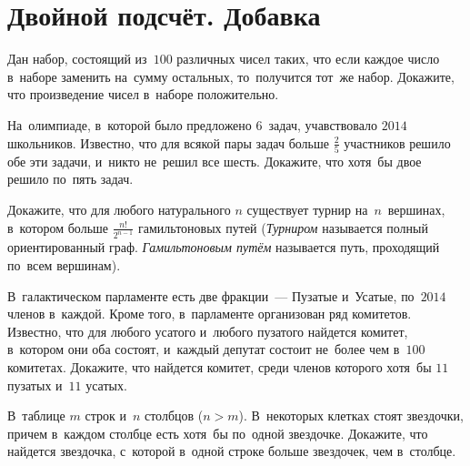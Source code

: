 
\section*{Двойной подсчёт. Добавка}

\begin{problems}

\item
Дан набор, состоящий из~$100$ различных чисел таких, что если каждое число
в~наборе заменить на~сумму остальных, то~получится тот~же набор.
Докажите, что произведение чисел в~наборе положительно.

\item
На~олимпиаде, в~которой было предложено $6$~задач, учавствовало $2014$
школьников.
Известно, что для всякой пары задач больше $\frac{2}{5}$ участников решило обе
эти задачи, и~никто не~решил все шесть.
Докажите, что хотя~бы двое решило по~пять задач.

\item
Докажите, что для любого натурального $n$ существует турнир на~$n$~вершинах,
в~котором больше $\frac{n!}{2^{n-1}}$ гамильтоновых путей
(\emph{Турниром} называется полный ориентированный граф.
\emph{Гамильтоновым путём} называется путь, проходящий по~всем вершинам).

\item
В~галактическом парламенте есть две фракции~--- Пузатые и~Усатые,
по~$2014$ членов в~каждой.
Кроме того, в~парламенте организован ряд комитетов.
Известно, что для любого усатого и~любого пузатого найдется комитет, в~котором
они оба состоят, и~каждый депутат состоит не~более чем в~$100$ комитетах.
Докажите, что найдется комитет, среди членов которого хотя~бы $11$ пузатых
и~$11$ усатых.

\item
В~таблице $m$ строк и~$n$ столбцов ($n > m$).
В~некоторых клетках стоят звездочки, причем в~каждом столбце есть хотя~бы
по~одной звездочке.
Докажите, что найдется звездочка, с~которой в~одной строке больше звездочек,
чем в~столбце.

\end{problems}

